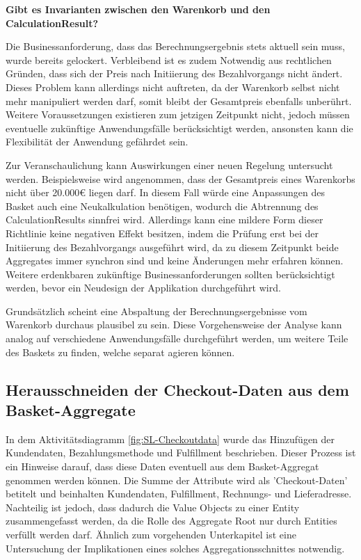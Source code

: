 \textbf{Gibt es Invarianten zwischen den Warenkorb und den CalculationResult?}

Die Businessanforderung, dass das Berechnungsergebnis stets aktuell sein muss, wurde bereits gelockert. Verbleibend ist es zudem Notwendig aus rechtlichen Gründen, dass sich der Preis nach Initiierung des Bezahlvorgangs nicht ändert. Dieses Problem kann allerdings nicht auftreten, da der Warenkorb selbst nicht mehr manipuliert werden darf, somit bleibt der Gesamtpreis ebenfalls unberührt. Weitere Voraussetzungen existieren zum jetzigen Zeitpunkt nicht, jedoch müssen eventuelle zukünftige Anwendungsfälle berücksichtigt werden, ansonsten kann die Flexibilität der Anwendung gefährdet sein. 

Zur Veranschaulichung kann Auswirkungen einer neuen Regelung untersucht werden. Beispielsweise wird angenommen, dass der Gesamtpreis eines Warenkorbs nicht über 20.000€ liegen darf. In diesem Fall würde eine Anpassungen des Basket auch eine Neukalkulation benötigen, wodurch die Abtrennung des CalculationResults sinnfrei wird. Allerdings kann eine mildere Form dieser Richtlinie keine negativen Effekt besitzen, indem die Prüfung erst bei der Initiierung des Bezahlvorgangs ausgeführt wird, da zu diesem Zeitpunkt beide Aggregates immer synchron sind und keine Änderungen mehr erfahren können. Weitere erdenkbaren zukünftige Businessanforderungen sollten berücksichtigt werden, bevor ein Neudesign der Applikation durchgeführt wird.

Grundsätzlich scheint eine Abspaltung der Berechnungsergebnisse vom Warenkorb durchaus plausibel zu sein. Diese Vorgehensweise der Analyse kann analog auf verschiedene Anwendungsfälle durchgeführt werden, um weitere Teile des Baskets zu finden, welche separat agieren können. 

\subsection{Herausschneiden der Checkout-Daten aus dem Basket-Aggregate}

In dem Aktivitätsdiagramm \ref{fig:SL-Checkoutdata} wurde das Hinzufügen der Kundendaten, Bezahlungsmethode und Fulfillment beschrieben. Dieser Prozess ist ein Hinweise darauf, dass diese Daten eventuell aus dem Basket-Aggregat genommen werden können. Die Summe der Attribute wird als 'Checkout-Daten' betitelt und beinhalten Kundendaten, Fulfillment, Rechnungs- und Lieferadresse. Nachteilig ist jedoch, dass dadurch die Value Objects zu einer Entity zusammengefasst werden, da die Rolle des Aggregate Root nur durch Entities verfüllt werden darf. Ähnlich zum vorgehenden Unterkapitel ist eine Untersuchung der Implikationen eines solches Aggregationsschnittes notwendig.

